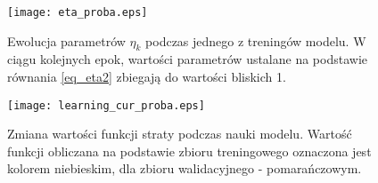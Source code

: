 \documentclass[11pt]{book}
\theoremstyle{definition}
\begin{document}
%
%
\begin{figure}[hp!]
	\centering
	\texttt{[image: eta\_proba.eps]}
	\caption{Ewolucja parametrów $\eta_k$ podczas jednego z treningów modelu. W ciągu kolejnych epok, wartości parametrów ustalane na podstawie równania \ref{eq_eta2} zbiegają do wartości bliskich 1.} 
	\label{fig:eta}
\end{figure}
%
%
\begin{figure}[hp!]
	\centering
	\texttt{[image: learning\_cur\_proba.eps]}
	\caption{Zmiana wartości funkcji straty podczas nauki modelu. Wartość funkcji obliczana na podstawie zbioru treningowego oznaczona jest kolorem niebieskim, dla zbioru walidacyjnego - pomarańczowym.} 
	\label{fig:learning_cur}
\end{figure}
%
%
\end{document}
